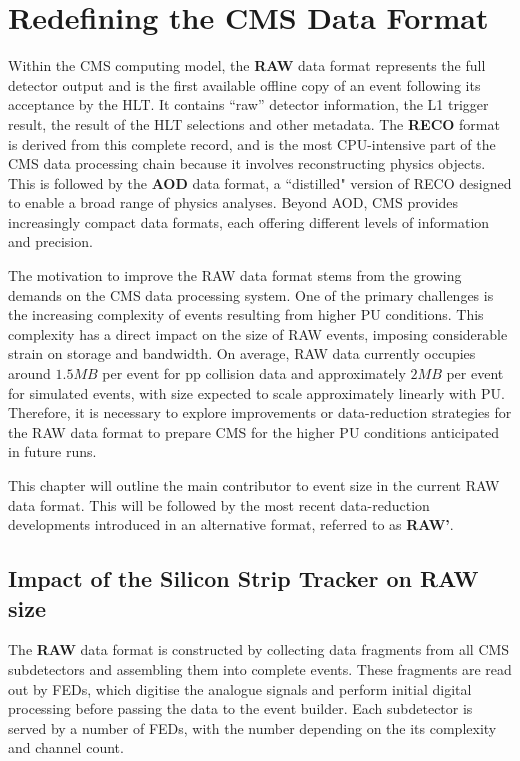 \chapter{Redefining the CMS Data Format}
\thispagestyle{plain}  %
\pagestyle{chapterpages}
\label{Section:Chapter5}
\minitoc

Within the \ac{CMS} computing model, the \textbf{RAW} data format represents the full detector output and is the first available offline copy of an event following its acceptance by the \ac{HLT}. It contains ``raw'' detector information, the \ac{L1} trigger result, the result of the \ac{HLT} selections and other metadata.  The \textbf{RECO} format is derived from this complete record, and is the most CPU-intensive part of the \ac{CMS} data processing chain because it involves reconstructing physics objects. This is followed by the \textbf{AOD} data format, a ``distilled" version of RECO designed to enable a broad range of physics analyses. Beyond AOD, \ac{CMS} provides increasingly compact data formats, each offering different levels of information and precision.

The motivation to improve the RAW data format stems from the growing demands on the \ac{CMS} data processing system. One of the primary challenges is the increasing complexity of events resulting from higher \ac{PU} conditions. This complexity has a direct impact on the size of RAW events, imposing considerable strain on storage and bandwidth.  On average, RAW data currently occupies around $1.5\unit{MB}$ per event for pp collision data and approximately $2\unit{MB}$ per event for simulated events, with size expected to scale approximately linearly with \ac{PU}. Therefore, it is necessary to explore improvements or data-reduction strategies for the RAW data format to prepare \ac{CMS} for the higher \ac{PU} conditions anticipated in future runs. 

This chapter will outline the main contributor to event size in the current RAW data format. This will be followed by the most recent data-reduction developments introduced in an alternative format, referred to as \textbf{RAW'}.

\section{Impact of the Silicon Strip Tracker on RAW size}
The \textbf{RAW} data format is constructed by collecting data fragments from all \ac{CMS} subdetectors and assembling them into complete events. These fragments are read out by FEDs, which digitise the analogue signals and perform initial digital processing before passing the data to the event builder. Each subdetector is served by a number of FEDs, with the number depending on the its complexity and channel count.

